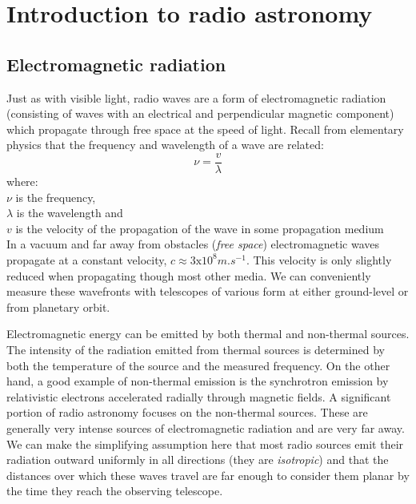 \documentclass[a4paper,10pt]{report}
\begin{document}
\section{Introduction to radio astronomy}
\subsection{Electromagnetic radiation}
Just as with visible light, radio waves are a form of electromagnetic radiation (consisting of waves with an electrical and perpendicular magnetic component) which propagate through free space at the speed 
of light. Recall from elementary physics that the frequency and wavelength of a wave are related:
\begin{equation*}
 \nu = \frac{v}{\lambda}
\end{equation*}
where:\\
$\nu$ is the frequency,\\
$\lambda$ is the wavelength and\\
$v$ is the velocity of the propagation of the wave in some propagation medium\\

In a vacuum and far away from obstacles (\textit{free space}) electromagnetic waves propagate at a constant velocity, $c\approx 3\text{x}10^8m.s^{-1}$. This velocity is only slightly reduced
when propagating though most other media. We can conveniently measure these wavefronts with telescopes of various form at either ground-level or from planetary orbit. 

Electromagnetic energy can be emitted by both thermal and non-thermal sources. The intensity of the radiation emitted from thermal sources is determined by both the temperature of the source and the measured frequency. On the other hand, a good example of non-thermal emission is the 
synchrotron emission by relativistic electrons accelerated radially through magnetic fields. A significant portion of radio astronomy focuses on the non-thermal sources. These are generally very intense sources of 
electromagnetic radiation and are very far away. We can make the simplifying assumption here that most radio sources emit their radiation outward uniformly in all directions (they are \textit{isotropic}) 
and that the distances over which these waves travel are far enough to consider them planar by the time they reach the observing telescope.
\end{document}
